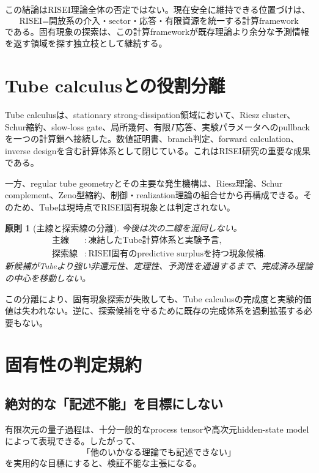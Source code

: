 \documentclass[11pt,a4paper,uplatex,dvipdfmx]{bxjsarticle}
\newtheorem{principle}[definition]{原則}
\theoremstyle{remark}
\begin{document}
この結論はRISEI理論全体の否定ではない。現在安全に維持できる位置づけは、
\begin{equation}
\boxed{
\text{RISEI}
=
\text{開放系の介入・sector・応答・有限資源を統一する計算framework}
}
\end{equation}
である。固有現象の探索は、この計算frameworkが既存理論より余分な予測情報を返す領域を探す独立枝として継続する。

\section{Tube calculusとの役割分離}

Tube calculusは、stationary strong-dissipation領域において、Riesz cluster、Schur縮約、slow-loss gate、局所幾何、有限$\Gamma$応答、実験パラメータへのpullbackを一つの計算鎖へ接続した。数値証明書、branch判定、forward calculation、inverse designを含む計算体系として閉じている。これはRISEI研究の重要な成果である。

一方、regular tube geometryとその主要な発生機構は、Riesz理論、Schur complement、Zeno型縮約、制御・realization理論の組合せから再構成できる。そのため、Tubeは現時点でRISEI固有現象とは判定されない。

\begin{principle}[主線と探索線の分離]
今後は次の二線を混同しない。
\begin{align}
\text{主線} &: \text{凍結したTube計算体系と実験予言},\\
\text{探索線} &: \text{RISEI固有のpredictive surplusを持つ現象候補}.
\end{align}
新候補がTubeより強い非還元性、定理性、予測性を通過するまで、完成済み理論の中心を移動しない。
\end{principle}

この分離により、固有現象探索が失敗しても、Tube calculusの完成度と実験的価値は失われない。逆に、探索候補を守るために既存の完成体系を過剰拡張する必要もない。

\section{固有性の判定規約}

\subsection{絶対的な「記述不能」を目標にしない}

有限次元の量子過程は、十分一般的なprocess tensorや高次元hidden-state modelによって表現できる。したがって、
\begin{equation}
\text{「他のいかなる理論でも記述できない」}
\end{equation}
を実用的な目標にすると、検証不能な主張になる。
\end{document}
